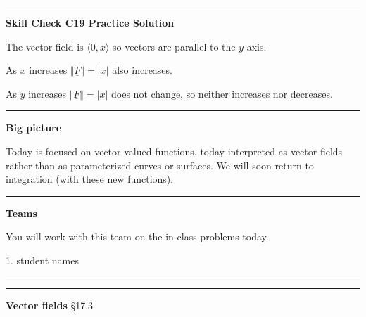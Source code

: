 \documentclass[12pt,letterpaper,noanswers]{exam}
\newcommand{\mb}[1]{\underline{#1}}
\begin{document}
\vspace{0.2cm}
\hrule
\vspace{0.2cm}

\noindent\textbf{Skill Check C19 Practice Solution}
\begin{questions}
\question 
\begin{parts}
\item The vector field is $\langle 0, x\rangle$ so vectors are parallel to the $y$-axis.
\item As $x$ increases $\Vert \mb F \Vert = \vert x \vert$ also increases.
\item As $y$ increases $\Vert \mb F \Vert = \vert x \vert$ does not change, so neither increases nor decreases.
\end{parts}
\end{questions}

\vspace{0.2cm}
\hrule
\vspace{0.2cm}



\noindent\textbf{Big picture}

Today is focused on vector valued functions, today interpreted as vector fields rather than as parameterized curves or surfaces.  We will soon return to integration (with these new functions).

\vspace{0.2cm}
\hrule
\vspace{0.2cm}

\noindent\textbf{Teams}

You will work with this team on the in-class problems today.
\begin{multicols}{2}
1.  student names

\end{multicols}

\hrule
\vspace{0.2cm}

\eject

\vspace{0.2cm}
\hrule
\vspace{0.2cm}

\noindent\textbf{Vector fields} \S 17.3
\end{document}
